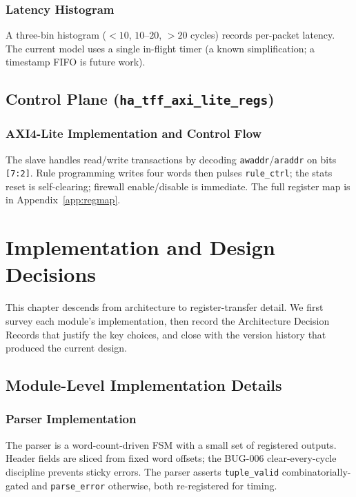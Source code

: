 \documentclass[12pt,twoside,openright]{book}
\begin{document}
\subsection{Latency Histogram}

A three-bin histogram ($<10$, $10\text{--}20$, $>20$ cycles) records per-packet latency. The current
model uses a single in-flight timer (a known simplification; a timestamp FIFO is future work).

\section{Control Plane (\texttt{ha\_tff\_axi\_lite\_regs})}

\subsection{AXI4-Lite Implementation and Control Flow}

The slave handles read/write transactions by decoding \texttt{awaddr}/\texttt{araddr} on bits
\texttt{[7:2]}. Rule programming writes four words then pulses \texttt{rule\_ctrl}; the stats reset
is self-clearing; firewall enable/disable is immediate. The full register map is in
Appendix~\ref{app:regmap}.

\chapter{Implementation and Design Decisions}
\label{chap:implementation}

This chapter descends from architecture to register-transfer detail. We first survey each module's
implementation, then record the Architecture Decision Records that justify the key choices, and
close with the version history that produced the current design.

\section{Module-Level Implementation Details}

\subsection{Parser Implementation}

The parser is a word-count-driven FSM with a small set of registered outputs. Header fields are
sliced from fixed word offsets; the BUG-006 clear-every-cycle discipline prevents sticky errors.
The parser asserts \texttt{tuple\_valid} combinatorially-gated and \texttt{parse\_error} otherwise,
both re-registered for timing.
\end{document}
